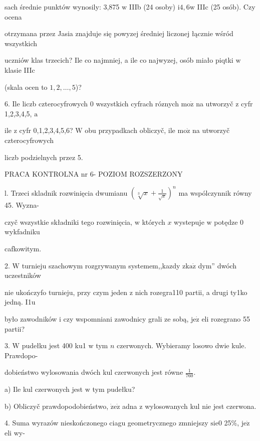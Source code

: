 \documentclass[a4paper,12pt]{article}
\begin{document}
sach średnie punktów wynosily: 3,875 $\mathrm{w}$ IIIb (24 osoby) $\mathrm{i}4,6\mathrm{w}$ IIIc (25 osób). Czy ocena

otrzymana przez Jasia znajduje się powyzej średniej liczonej łącznie wśród wszystkich

uczniów klas trzecich? Ile co najmniej, a ile co najwyzej, osób miało piqtki $\mathrm{w}$ klasie IIIc

(skala ocen to $1,2,\ldots,5$)?

6. Ile liczb czterocyfrowych $0$ wszystkich cyfrach róznych $\mathrm{m}\mathrm{o}\dot{\mathrm{z}}$ na utworzyč $\mathrm{z}$ cyfr 1,2,3,4,5, $\mathrm{a}$

ile $\mathrm{z}$ cyfr 0,1,2,3,4,5,6? $\mathrm{W}$ obu przypadkach obliczyč, ile $\mathrm{m}\mathrm{o}\dot{\mathrm{z}}$ na utworzyč czterocyfrowych

liczb podzielnych przez 5.





PRACA KONTROLNA nr 6- POZIOM ROZSZERZONY

l. Trzeci skladnik rozwinięcia dwumianu $(\displaystyle \sqrt[3]{x}+\frac{1}{\sqrt{x}})^{n}$ ma wspólczynnik równy 45. Wyzna-

czyč wszystkie składniki tego rozwinięcia, $\mathrm{w}$ których $x$ wystepuje $\mathrm{w}$ potędze $0$ wykfadniku

cafkowitym.

2. $\mathrm{W}$ turnieju szachowym rozgrywanym systemem,,kazdy $\mathrm{z}\mathrm{k}\mathrm{a}\dot{\mathrm{z}}$ dym'' dwóch uczestników

nie ukończyfo turnieju, przy czym jeden $\mathrm{z}$ nich rozegra110 partii, a drugi ty1ko jedną. I1u

było zawodników $\mathrm{i}$ czy wspomniani zawodnicy grali ze sobą, $\mathrm{j}\mathrm{e}\dot{\mathrm{z}}$ eli rozegrano 55 partii?

3. $\mathrm{W}$ pudełku jest 400 ku1 $\mathrm{w}$ tym $n$ czerwonych. Wybieramy losowo dwie kule. Prawdopo-

dobieństwo wylosowania dwóch kul czerwonych jest równe $\displaystyle \frac{1}{760}.$

a) Ile kul czerwonych jest $\mathrm{w}$ tym pudełku?

b) Obliczyč prawdopodobieństwo, $\dot{\mathrm{z}}\mathrm{e}\dot{\mathrm{z}}$ adna $\mathrm{z}$ wylosowanych kul nie jest czerwona.

4. Suma wyrazów nieskończonego ciagu geometrycznego zmniejszy $\mathrm{s}\mathrm{i}\mathrm{e}0$ 25\%, $\mathrm{j}\mathrm{e}\dot{\mathrm{z}}$ eli wy-
\end{document}
